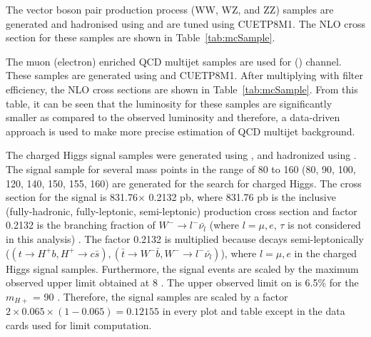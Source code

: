 The vector boson pair production process (WW, WZ, and ZZ) samples are generated and hadronised 
using \PYTHIA and are tuned using CUETP8M1. The NLO cross section for these samples are shown 
in Table~\ref{tab:mcSample}.

The muon (electron) enriched QCD multijet samples are used for \mujets (\ejets) channel. These 
samples are generated using \PYTHIA and CUETP8M1. After multiplying with filter efficiency, the 
NLO cross sections are shown in Table~\ref{tab:mcSample}. From this table, it can be seen that the 
luminosity for these samples are significantly 
smaller as compared to the observed luminosity and therefore, a data-driven approach is used to 
make more precise estimation of QCD multijet background.

The charged Higgs signal samples were generated using \MGvATNLO, and hadronized using \PYTHIA. The 
signal sample for several mass points in the range of 80 to 160 \GeV (80, 90, 100, 120, 140, 150, 
155, 160) are generated for the search for charged Higgs. The cross section 
for the signal is 831.76$\times$ 0.2132 pb, where 831.76 \unit{pb} is the inclusive 
(fully-hadronic, fully-leptonic, semi-leptonic) \ttjets production cross section and factor 
0.2132 is the branching fraction of $W^-\to l^- \bar{\nu_l}$ (where $l = \mu, e$, $\tau$ is not 
considered in this analysis) \cite{Beringer:1900zz}. The factor 0.2132 is multiplied because \ttbar decays 
semi-leptonically ($(t\to H^+ b, H^+\to c\bar{s}), (\bar{t}\to W^-\bar{b}, W^- \to l^-\bar{\nu_l})$), 
where $l = \mu, e$ in the charged Higgs signal samples. Furthermore, the signal events are scaled by 
the maximum observed upper limit obtained at 8 \TeV. The upper observed limit on \brThb is 6.5\% for
the $m_{H+}$ = 90 \GeV\cite{Khachatryan:2015uua}. Therefore, the signal samples are scaled by a factor 
$2\times 0.065\times (1-0.065) = 0.12155$ in every plot and table except in the data cards used for 
limit computation. 

